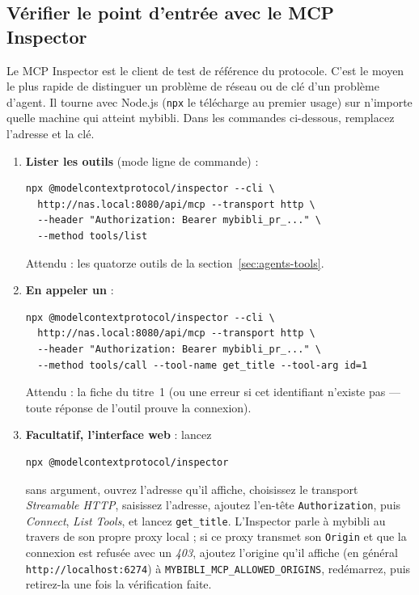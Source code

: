 \subsection{Vérifier le point d'entrée avec le MCP Inspector}
\label{sec:agents-inspector}

Le MCP Inspector est le client de test de référence du protocole.
C'est le moyen le plus rapide de distinguer un problème de réseau ou
de clé d'un problème d'agent. Il tourne avec Node.js (\texttt{npx} le
télécharge au premier usage) sur n'importe quelle machine qui atteint
mybibli. Dans les commandes ci-dessous, remplacez l'adresse et la
clé.

\begin{enumerate}
  \item \textbf{Lister les outils} (mode ligne de commande) :
\begin{lstlisting}
npx @modelcontextprotocol/inspector --cli \
  http://nas.local:8080/api/mcp --transport http \
  --header "Authorization: Bearer mybibli_pr_..." \
  --method tools/list
\end{lstlisting}
        Attendu : les quatorze outils de la
        section~\ref{sec:agents-tools}.
  \item \textbf{En appeler un} :
\begin{lstlisting}
npx @modelcontextprotocol/inspector --cli \
  http://nas.local:8080/api/mcp --transport http \
  --header "Authorization: Bearer mybibli_pr_..." \
  --method tools/call --tool-name get_title --tool-arg id=1
\end{lstlisting}
        Attendu : la fiche du titre~1 (ou une erreur si cet
        identifiant n'existe pas --- toute réponse de l'outil prouve
        la connexion).
  \item \textbf{Facultatif, l'interface web} : lancez
\begin{lstlisting}
npx @modelcontextprotocol/inspector
\end{lstlisting}
        sans argument, ouvrez l'adresse qu'il affiche, choisissez le
        transport \emph{Streamable HTTP}, saisissez l'adresse, ajoutez
        l'en-tête \texttt{Authorization}, puis \emph{Connect},
        \emph{List Tools}, et lancez \texttt{get\_title}. L'Inspector
        parle à mybibli au travers de son propre proxy local ; si ce
        proxy transmet son \texttt{Origin} et que la connexion est
        refusée avec un \emph{403}, ajoutez l'origine qu'il affiche
        (en général \texttt{http://localhost:6274}) à
        \texttt{MYBIBLI\_MCP\_ALLOWED\_ORIGINS}, redémarrez, puis
        retirez-la une fois la vérification faite.
\end{enumerate}


